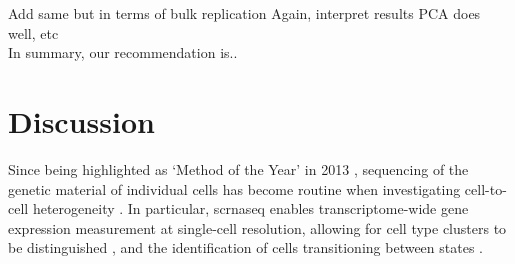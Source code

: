 
Add same but in terms of bulk replication
Again, interpret results 
PCA does well, etc \\

In summary, our recommendation is..




\clearpage

\section{Discussion}

Since being highlighted as `Method of the Year' in 2013 \cite{editorial2014method}, sequencing of the genetic material of individual cells has become routine when investigating cell-to-cell heterogeneity \cite{lahnemann2020eleven}. 
In particular, 
\gls{scrnaseq}
enables transcriptome-wide gene expression measurement at single-cell resolution, allowing for cell type clusters to be distinguished \cite{anchang2016visualization, young2018single, muraro2016single, ernst2019staged, pijuan2019single, velten2017human},
and the identification of cells transitioning between states \cite{la2018rna, buettner2015computational, trapnell2014dynamics, bendall2014single, moignard2015decoding}. \\


